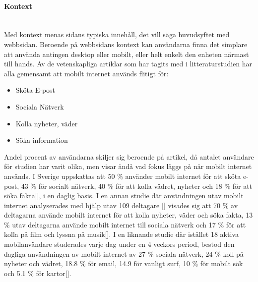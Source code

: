 \documentclass[11pt]{article}
\begin{document}
\paragraph{Kontext}\mbox{} \\

Med kontext menas sidans typiska innehåll, det vill säga huvudsyftet med webbsidan. Beroende på webbsidans kontext kan användarna finna det simplare att använda antingen desktop eller mobilt, eller helt enkelt den enheten närmast till hands. Av de vetenskapliga artiklar som har tagits med i litteraturstudien har alla gemensamt att mobilt internet används flitigt för:

\begin{itemize}
	\item{Sköta E-post}
	\item{Sociala Nätverk}
	\item{Kolla nyheter, väder}
	\item{Söka information}
\end{itemize}
\bigskip
Andel procent av användarna skiljer sig beroende på artikel, då antalet användare för studien har varit olika, men visar ändå vad fokus läggs på när mobilt internet används. I Sverige uppskattas att 50 \% använder mobilt internet för att sköta e-post, 43 \% för socialt nätverk, 40 \% för att kolla vädret, nyheter och 18 \% för att söka fakta[], i en daglig basis. I en annan studie där användningen utav mobilt internet analyserades med hjälp utav 109 deltagare [] visades sig att 70 \% av deltagarna använde mobilt internet för att kolla nyheter, väder och söka fakta, 13 \% utav deltagarna använde mobilt internet till sociala nätverk och 17 \% för att kolla på film och lyssna på musik[]. I en liknande studie där istället 18 aktiva mobilanvändare studerades varje dag under en 4 veckors period, bestod den dagliga användningen av mobilt internet av 27 \% sociala nätverk, 24 \% koll på nyheter och vädret, 18.8 \% för email, 14.9 för vanligt surf, 10 \% för mobilt sök och 5.1 \% för kartor[].
\end{document}
